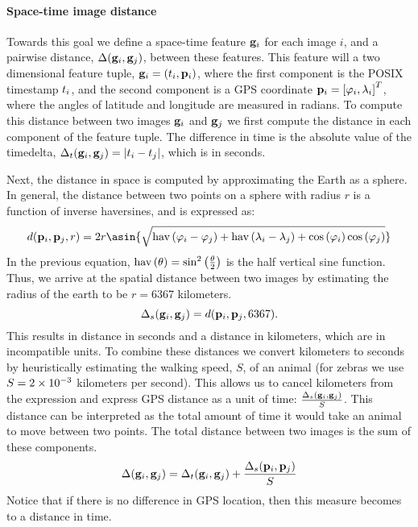     \paragraph{Space-time image distance}
    Towards this goal we define a space-time feature $\mathbf{g}_i$ for each image
      $i$, and a pairwise distance, $\Delta(\mathbf{g}_i, \mathbf{g}_j)$, between these
      features.
    This feature will a two dimensional feature tuple, %
    $\mathbf{g}_i = \left(t_i, \mathbf{p}_i\right)$, where the first component is the POSIX
      timestamp $t_i$, and the second component is a GPS coordinate %
    $\mathbf{p}_i = \left[\varphi_i, \lambda_i\right]^{T}$, where the angles of latitude and
      longitude are measured in radians.
    To compute this distance between two images $\mathbf{g}_i$ and $\mathbf{g}_j$ we first
      compute the distance in each component of the feature tuple.
    The difference in time is the absolute value of the timedelta,  %
    $\Delta_t(\mathbf{g}_i, \mathbf{g}_j) = |t_i - t_j|$, which is in seconds.

    Next, the distance in space is computed by approximating the Earth as a
      sphere.
    In general, the distance between two points on a sphere with radius $r$ is
      a function of inverse haversines, and is expressed as:
    \begin{equation}\label{eqn:geodistance}
        d(\gps_i, \gps_j, r) =
        2 r \asin{\sqrt{
            \haversine{\lat_i - \lat_j} +
            \haversine{\lon_i - \lon_j} +
            \cos\paren{\lat_i} \cos\paren{\lat_j}}}
    \end{equation}
    In the previous equation, $\mathbin{\operatorname{hav}}\left(\theta\right) = \sin^{2}\left(\frac{\theta}{2}\right)$ is
      the half vertical sine function.
    Thus, we arrive at the spatial distance between two images by estimating
      the radius of the earth to be $r=6367$ kilometers.
    \begin{equation}
        \Delta_s(\mathbf{g}_i, \mathbf{g}_j) = d(\mathbf{p}_i, \mathbf{p}_j, 6367).
    \end{equation}
    This results in distance in seconds and a distance in kilometers, which
      are in incompatible units.
    To combine these distances we convert kilometers to seconds by
      heuristically estimating the walking speed, $S$, of an animal (for zebras
      we use $S=2\times 10^{-3}$ kilometers per second).
    This allows us to cancel kilometers from the expression and express GPS
      distance as a unit of time:
    $\frac{\Delta_s(\mathbf{g}_i, \mathbf{g}_j)}{S}$.
    This distance can be interpreted as the total amount of time it would take
      an animal to move between two points.
    The total distance between two images is the sum of these components.
    \begin{equation}\label{eqn:imgdist}
        \Delta(\mathbf{g}_i, \mathbf{g}_j) =
        \Delta_t(\mathbf{g}_i, \mathbf{g}_j) + \frac{\Delta_s(\mathbf{p}_i, \mathbf{p}_j)}{S}
    \end{equation}
    Notice that if there is no difference in GPS location, then this measure
      becomes to a distance in time.

